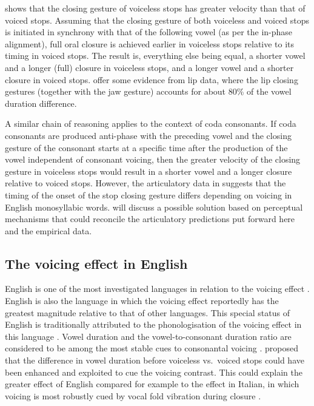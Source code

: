 \documentclass[12pt,a4paper,]{article}
\begin{document}
\citet{van-summers1987} shows that the closing gesture of voiceless
stops has greater velocity than that of voiced stops. Assuming that the
closing gesture of both voiceless and voiced stops is initiated in
synchrony with that of the following vowel (as per the in-phase
alignment), full oral closure is achieved earlier in voiceless stops
relative to its timing in voiced stops. The result is, everything else
being equal, a shorter vowel and a longer (full) closure in voiceless
stops, and a longer vowel and a shorter closure in voiced stops.
\citet{warren2006} offer some evidence from lip data, where the lip
closing gestures (together with the jaw gesture) accounts for about 80\%
of the vowel duration difference.

A similar chain of reasoning applies to the context of coda consonants.
If coda consonants are produced anti-phase with the preceding vowel and
the closing gesture of the consonant starts at a specific time after the
production of the vowel independent of consonant voicing, then the
greater velocity of the closing gesture in voiceless stops would result
in a shorter vowel and a longer closure relative to voiced stops.
However, the articulatory data in \citet{de-jong1991} suggests that the
timing of the onset of the stop closing gesture differs depending on
voicing in English monosyllabic words.  will discuss a
possible solution based on perceptual mechanisms that could reconcile
the articulatory predictions put forward here and the empirical data.

\hypertarget{the-voicing-effect-in-english}{%
\subsection{The voicing effect in
English}\label{the-voicing-effect-in-english}}

\label{s:ve-eng}

English is one of the most investigated languages in relation to the
voicing effect
\citep{meyer1904, heffner1937, house1953, belasco1953, peterson1960, halle1967, chen1970, klatt1973, lisker1974, laeufer1992, fowler1992, hussein1994, lampp2004, warren2005, durvasula2012, ko2018}.
English is also the language in which the voicing effect reportedly has
the greatest magnitude relative to that of other languages. This special
status of English is traditionally attributed to the phonologisation of
the voicing effect in this language \citep{sharf1964, de-jong2004}.
Vowel duration and the vowel-to-consonant duration ratio are considered
to be among the most stable cues to consonantal voicing
\citep{peterson1960, raphael1972, port1982}. \citet{kluender1988}
proposed that the difference in vowel duration before voiceless
vs.~voiced stops could have been enhanced and exploited to cue the
voicing contrast. This could explain the greater effect of English
compared for example to the effect in Italian, in which voicing is most
robustly cued by vocal fold vibration during closure \citep{pape2014}.
\end{document}
